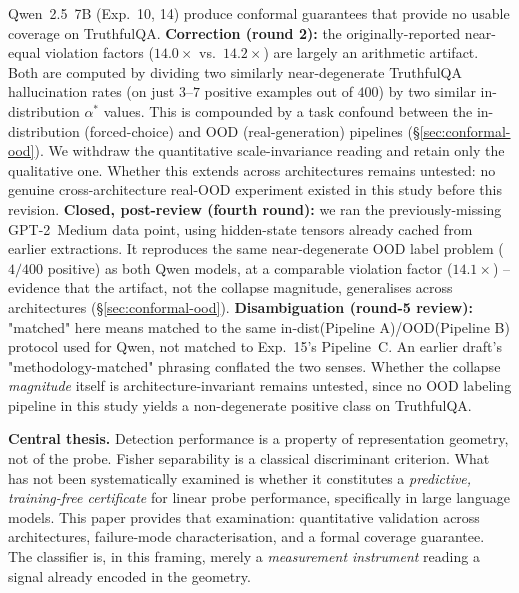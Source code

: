 \documentclass[10pt,twocolumn]{article}
\begin{document}
\begin{enumerate}[leftmargin=*, topsep=2pt, itemsep=1pt]
    Qwen~2.5~7B (Exp.~10, 14) produce conformal guarantees that provide
    no usable coverage on TruthfulQA. \textbf{Correction (round 2):} the
    originally-reported near-equal violation factors ($14.0\times$ vs.\
    $14.2\times$) are largely an arithmetic artifact. Both are computed
    by dividing two similarly near-degenerate TruthfulQA hallucination
    rates (on just $3$--$7$ positive examples out of $400$) by two
    similar in-distribution $\alpha^*$ values. This is compounded by a
    task confound between the in-distribution (forced-choice) and OOD
    (real-generation) pipelines (\S\ref{sec:conformal-ood}). We withdraw
    the quantitative scale-invariance reading and retain only the
    qualitative one. Whether this extends across architectures remains
    untested: no genuine cross-architecture real-OOD experiment existed
    in this study before this revision. \textbf{Closed, post-review
    (fourth round):} we ran the previously-missing GPT-2~Medium data
    point, using hidden-state tensors already cached from earlier
    extractions. It reproduces the same near-degenerate OOD label
    problem ($4/400$ positive) as both Qwen models, at a comparable
    violation factor ($14.1\times$) -- evidence that the artifact, not
    the collapse magnitude, generalises across architectures
    (\S\ref{sec:conformal-ood}). \textbf{Disambiguation (round-5
    review):} "matched" here means matched to the same in-dist(Pipeline
    A)/OOD(Pipeline B) protocol used for Qwen, not matched to Exp.~15's
    Pipeline~C. An earlier draft's "methodology-matched" phrasing
    conflated the two senses. Whether the collapse \emph{magnitude}
    itself is architecture-invariant remains untested, since no OOD
    labeling pipeline in this study yields a non-degenerate positive
    class on TruthfulQA.
\end{enumerate}

\medskip
\noindent\textbf{Central thesis.}
Detection performance is a property of representation geometry, not of
the probe. Fisher separability is a classical discriminant criterion.
What has not been systematically examined is whether it constitutes a
\emph{predictive, training-free certificate} for linear probe
performance, specifically in large language models. This paper provides
that examination: quantitative validation across architectures,
failure-mode characterisation, and a formal coverage guarantee. The
classifier is, in this framing, merely a \emph{measurement instrument}
reading a signal already encoded in the geometry.
\end{document}
